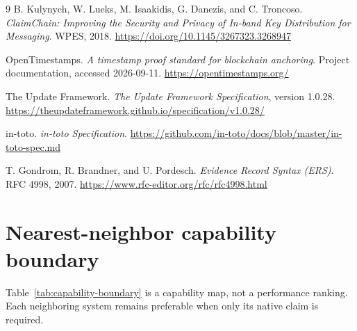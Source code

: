 \documentclass[acmsmall,screen,review,nonacm]{acmart}
\begin{document}
\begin{thebibliography}{9}
B. Kulynych, W. Lueks, M. Isaakidis, G. Danezis, and C. Troncoso.
\emph{ClaimChain: Improving the Security and Privacy of In-band Key
Distribution for Messaging}. WPES, 2018.
\url{https://doi.org/10.1145/3267323.3268947}

OpenTimestamps. \emph{A timestamp proof standard for blockchain anchoring}.
Project documentation, accessed 2026-09-11. \url{https://opentimestamps.org/}

The Update Framework. \emph{The Update Framework Specification}, version 1.0.28. \url{https://theupdateframework.github.io/specification/v1.0.28/}

in-toto. \emph{in-toto Specification}. \url{https://github.com/in-toto/docs/blob/master/in-toto-spec.md}

T. Gondrom, R. Brandner, and U. Pordesch. \emph{Evidence Record Syntax
(ERS)}. RFC 4998, 2007. \url{https://www.rfc-editor.org/rfc/rfc4998.html}
\end{thebibliography}

\ifdefined\ACSDACSAC
  \appendices
\else
  \appendix
\fi
\section{Nearest-neighbor capability boundary}
\label{app:capability-boundary}

Table~\ref{tab:capability-boundary} is a capability map, not a performance
ranking. Each neighboring system remains preferable when only its native
claim is required.
\end{document}
